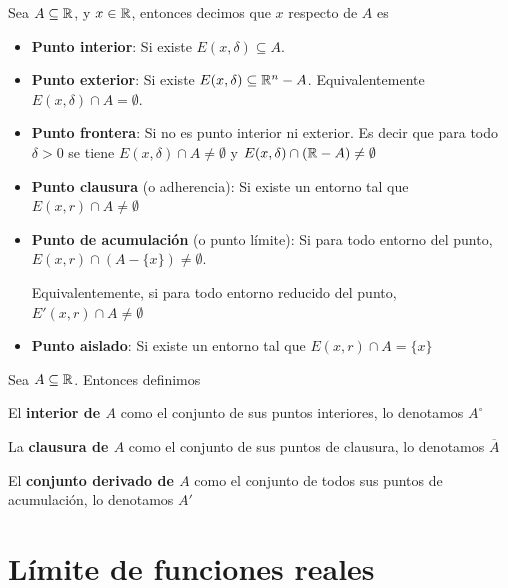 \begin{definition}[Puntos] \label{clasif_topo_puntos_r}
	
Sea $A \subseteq \mathbb{R}$, y $x \in \mathbb{R}$, entonces decimos que $x$ respecto de $A$ es 
	
\begin{itemize}
\item \textbf{Punto interior}: Si existe $E(x,\delta) \subseteq A$.
		
\item \textbf{Punto exterior}: Si existe $E(x,\delta) \subseteq \mathbb{R}^n - A$.  Equivalentemente $E(x,\delta) \cap A = \emptyset$.
		
\item \textbf{Punto frontera}: Si no es punto interior ni exterior.  Es decir que para todo $ \delta > 0$ se tiene $E(x,\delta) \cap A \neq \emptyset$ y $E(x,\delta) \cap (\mathbb{R} - A) \neq \emptyset$
		
\item \textbf{Punto clausura} (o adherencia): Si existe un entorno tal que $E(x,r) \cap A \neq \emptyset$
		
\item \textbf{Punto de acumulación} (o punto límite): Si para todo entorno del punto, $ E(x,r) \cap (A - \{x\}) \neq \emptyset$.
		
Equivalentemente, si para todo entorno reducido del punto, $ E'(x,r) \cap A \neq \emptyset$
		
\item \textbf{Punto aislado}: Si existe un entorno tal que $E(x,r) \cap A = \{x\}$
\end{itemize}
\end{definition}

\begin{definition}[Interior] \label{conjunto_interior_r}
Sea $A \subseteq \mathbb{R}$.  Entonces definimos
	
El \textbf{interior de $A$} como el conjunto de sus puntos interiores, lo denotamos $A^{\circ}$
	
La \textbf{clausura de $A$} como el conjunto de sus puntos de clausura, lo denotamos $\overline{A}$
	
El \textbf{conjunto derivado de $A$} como el conjunto de todos sus puntos de acumulación, lo denotamos $A'$
\end{definition}

\chapter{Límite de funciones reales}

